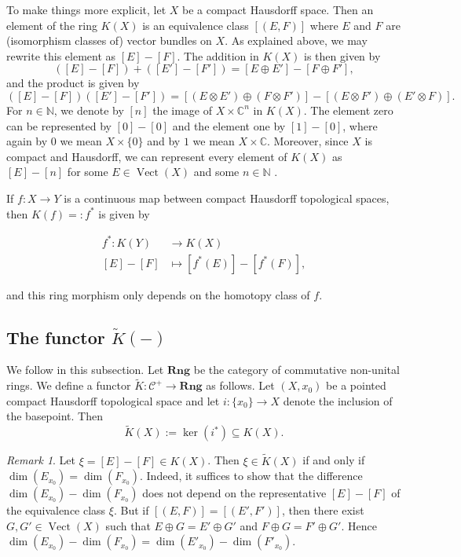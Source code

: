 \documentclass[12pt,a4paper]{amsart}
\theoremstyle{plain}
\theoremstyle{definition}
\theoremstyle{remark}
\newtheorem{rem}[thm]{Remark}
\begin{document}
To make things more explicit, let $X$ be a compact Hausdorff space.
Then an element of the ring $K(X)$ is an equivalence class $[(E,F)]$ where $E$ and $F$ are (isomorphism classes of) vector bundles on $X$.
As explained above, we may rewrite this element as $[E] - [F]$.
The addition in $K(X)$ is then given by
\[ ([E] - [F]) + ([E'] - [F']) = [E \oplus E'] - [F \oplus F'], \]
and the product is given by
\[ ([E] - [F]) ([E'] - [F']) = [(E \otimes E') \oplus (F \otimes F')] - [(E \otimes F') \oplus (E' \otimes F)]. \]
For $n \in \mathbb{N}$, we denote by $[n]$ the image of $X \times \mathbb{C}^{n}$ in $K(X)$.
The element zero can be represented by $[0] - [0]$ and the element one by $[1] - [0]$, where again by $0$ we mean $X \times \{0\}$ and by $1$ we mean $X \times \mathbb{C}$.
Moreover, since $X$ is compact and Hausdorff, we can represent every element of $K(X)$ as $[E] - [n]$ for some $E \in \operatorname{Vect}(X)$ and some $n \in \mathbb{N}$ \cite[p.~44]{ati67}.

If $f \colon X \to Y$ is a continuous map between compact Hausdorff topological spaces, then $K(f) =: f^{*}$ is given by

\begin{align*}
  f^{*} \colon K(Y) & \to K(X) \\
  [E] - [F] & \mapsto [f^{*}(E)] - [f^{*}(F)],
\end{align*}

and this ring morphism only depends on the homotopy class of $f$.

\subsection{The functor $\tilde{K}(-)$}
We follow \cite[p.~66]{ati67} in this subsection.
Let $\mathbf{Rng}$ be the category of commutative non-unital rings.
We define a functor $\tilde{K} \colon \mathcal{C}^{+} \to \mathbf{Rng}$ as follows.
Let $(X,x_{0})$ be a pointed compact Hausdorff topological space and let $i \colon \{ x_{0} \} \to X$ denote the inclusion of the basepoint.
Then
\[ \tilde{K}(X) := \ker(i^{*}) \subseteq K(X). \]

\begin{rem}
  Let $\xi = [E] - [F] \in K(X)$.
  Then $\xi \in \tilde{K}(X)$ if and only if $\dim(E_{x_{0}}) = \dim(F_{x_{0}})$.
  Indeed, it suffices to show that the difference $\dim(E_{x_{0}}) - \dim(F_{x_{0}})$ does not depend on the representative $[E] - [F]$ of the equivalence class $\xi$.
  But if $[(E,F)] = [(E',F')]$, then there exist $G,G' \in \operatorname{Vect}(X)$ such that $E \oplus G = E' \oplus G'$ and $F \oplus G = F' \oplus G'$.
  Hence $\dim(E_{x_{0}}) - \dim(F_{x_{0}}) = \dim(E'_{x_{0}}) - \dim(F'_{x_{0}})$.
\end{rem}
\end{document}
